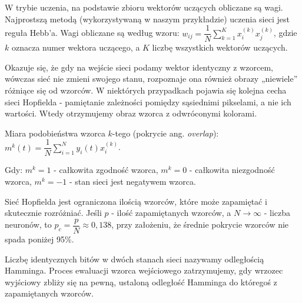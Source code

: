 W trybie uczenia, na podstawie zbioru wektorów uczących obliczane są wagi. Najprostszą metodą (wykorzystywaną w naszym przykładzie) uczenia sieci jest reguła Hebb’a. Wagi obliczane są według wzoru:\newline
$ w_{ij} = \dfrac{1}{N} \sum_{k=1}^K x_i^{(k)}x_j^{(k)} $, gdzie $ k $ oznacza numer wektora uczącego, a $ K $ liczbę wszystkich wektorów uczących.

Okazuje się, że gdy na wejście sieci podamy wektor identyczny z wzorcem, wówczas sieć nie zmieni swojego stanu, rozpoznaje ona również obrazy „niewiele” różniące się od wzorców. W niektórych przypadkach pojawia się kolejna cecha sieci Hopfielda - pamiętanie zależności pomiędzy sąsiednimi pikselami, a nie ich wartości. Wtedy otrzymujemy obraz wzorca z odwróconymi kolorami.

Miara podobieństwa wzorca $ k $-tego (pokrycie ang. \textit{overlap}):\newline
$ m^k(t) = \dfrac{1}{N} \sum_{i=1}^{N} y_i(t)x^{(k)}_i $.

Gdy:\newline
$ m^k = 1 $ - całkowita zgodność wzorca,\newline
$ m^k = 0 $ - całkowita niezgodność wzorca,\newline
$ m^k = -1 $ - stan sieci jest negatywem wzorca.

Sieć Hopfielda jest ograniczona ilością wzorców, które może zapamiętać i skutecznie rozróżniać. Jeśli $ p $ - ilość zapamiętanych wzorców, a $ N \to \infty $ - liczba neuronów, to $ p_c = \dfrac{p}{N} \approx 0,138 $, przy założeniu, że średnie pokrycie wzorców nie spada poniżej 95\%.

Liczbę identycznych bitów w dwóch stanach sieci nazywamy odległością Hamminga. Proces ewaluacji wzorca wejściowego zatrzymujemy, gdy wrzozec wyjściowy zbliży się na pewną, ustaloną odległość Hamminga do któregoś z zapamiętanych wzorców.


